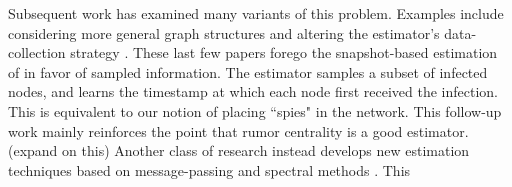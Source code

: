 \documentclass[10pt, twocolumn]{article}
\begin{document}
Subsequent work has examined many variants of this problem. Examples include considering more general graph structures \cite{shah2012rumor} and altering the estimator's data-collection strategy \cite{pinto,karamchandani2013rumor,luo2013identify}. These last few papers forego the snapshot-based estimation of \cite{shah2011rumors} in favor of sampled information. The estimator samples a subset of infected nodes, and learns the timestamp at which each node first received the infection. This is equivalent to our notion of placing ``spies" in the network. 
This follow-up work mainly reinforces the point that rumor centrality is a good estimator. (expand on this)
Another class of research instead develops new estimation techniques based on message-passing \cite{lokhov2014inferring} and spectral methods \cite{fioriti2012predicting}.
This 





\end{document}
